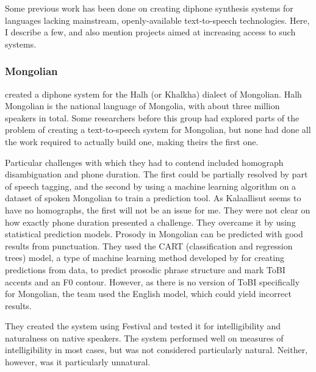 \documentclass[12pt]{article}
\begin{document}
		Some previous work has been done on creating diphone synthesis systems for languages lacking mainstream, openly-available text-to-speech technologies. Here, I describe a few, and also mention projects aimed at increasing access to such systems. \par

		\subsubsection{Mongolian}

		\citet{mongolian} created a diphone system for the Halh (or Khalkha) dialect of Mongolian. Halh Mongolian is the national language of Mongolia, with about three million speakers in total. Some researchers before this group had explored parts of the problem of creating a text-to-speech system for Mongolian, but none had done all the work required to actually build one, making theirs the first one. \par

		Particular challenges with which they had to contend included homograph disambiguation and phone duration. The first could be partially resolved by part of speech tagging, and the second by using a machine learning algorithm on a dataset of spoken Mongolian to train a prediction tool. As Kalaallisut seems to have no homographs, the first will not be an issue for me. They were not clear on how exactly phone duration presented a challenge. They overcame it by using statistical prediction models. Prosody in Mongolian can be predicted with good results from punctuation. They used the CART (classification and regression trees) model, a type of machine learning method developed by \citet{cart} for creating predictions from data, to predict prosodic phrase structure and mark ToBI accents and an F0 contour. However, as there is no version of ToBI specifically for Mongolian, the team used the English model, which could yield incorrect results.\par

		They created the system using Festival and tested it for intelligibility and naturalness on native speakers. The system performed well on measures of intelligibility in most cases, but was not considered particularly natural. Neither, however, was it particularly unnatural. \par
\end{document}

